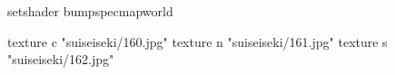 setshader bumpspecmapworld

    texture c "suiseiseki/160.jpg"
    texture n "suiseiseki/161.jpg"
    texture s "suiseiseki/162.jpg"

